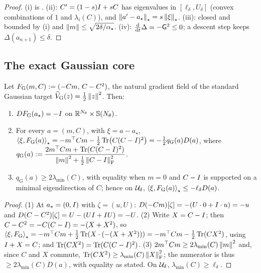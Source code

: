 \begin{proof}
(i) is . (ii): $C'=(1-s)I+sC$ has eigenvalues in $[\ell_\delta,U_\delta]$ (convex
combinations of $1$ and $\lambda_i(C)$), and $\left\lVert a'-a_\star\right\rVert_\star=s\left\lVert \xi\right\rVert_\star$. (iii): closed
and bounded by (i) and $\left\lVert m\right\rVert\leq\sqrt{2\delta/\alpha_\star}$. (iv): $\tfrac{\mathrm{d}}{\mathrm{d} t}\Delta=-\mathsf{G}^2\leq0$;
a descent step keeps $\Delta(a_{n+1})\leq\delta$.
\end{proof}

\subsection{The exact Gaussian core}

\begin{lemma}
\label{lem:gauss-core}
Let $F_{\mathrm G}(m,C):=(-Cm,\,C-C^2)$, the natural gradient field of the standard Gaussian target
$\widehat V_{\mathrm G}(z)=\tfrac12\left\lVert z\right\rVert^2$. Then:
\begin{enumerate}
\item $DF_{\mathrm G}(a_\star)=-I$ on $\mathbb{R}^{N_\theta}\times\mathbb{S}(N_\theta)$.
\item For every $a=(m,C)$, with $\xi=a-a_\star$,
$\left\langle \xi,F_{\mathrm G}(a)\right\rangle_\star=-m^\top Cm-\tfrac12\operatorname{Tr}\bigl(C(C-I)^2\bigr)=-\tfrac12q_{\mathrm G}(a)D(a)$,
where $q_{\mathrm G}(a):=\dfrac{2m^\top Cm+\operatorname{Tr}(C(C-I)^2)}{\left\lVert m\right\rVert^2+\tfrac12\left\lVert C-I\right\rVert_{\mathrm{F}}^2}$.
\item $q_{\mathrm G}(a)\geq2\lambda_{\min}(C)$, with equality when $m=0$ and $C-I$ is supported on
a minimal eigendirection of $C$; hence on $\mathcal{U}_\delta$,
$\left\langle \xi,F_{\mathrm G}(a)\right\rangle_\star\leq-\ell_\delta D(a)$.
\end{enumerate}
\end{lemma}

\begin{proof}
(1) At $a_\star=(0,I)$ with $\zeta=(u,U)$: $D(-Cm)[\zeta]=-(U\cdot0+I\cdot u)=-u$ and
$D(C-C^2)[\zeta]=U-(UI+I U)=-U$. (2) Write $X=C-I$; then $C-C^2=-C(C-I)=-(X+X^2)$, so
$\left\langle \xi,F_{\mathrm G}\right\rangle_\star=-m^\top Cm+\tfrac12\operatorname{Tr}(X\cdot(-(X+X^2)))=-m^\top Cm-\tfrac12\operatorname{Tr}(CX^2)$,
using $I+X=C$; and $\operatorname{Tr}(CX^2)=\operatorname{Tr}(C(C-I)^2)$. (3) $2m^\top Cm\geq2\lambda_{\min}(C)\left\lVert m\right\rVert^2$ and,
since $C$ and $X$ commute, $\operatorname{Tr}(CX^2)\geq\lambda_{\min}(C)\left\lVert X\right\rVert_{\mathrm{F}}^2$; the numerator is thus
$\geq2\lambda_{\min}(C)D(a)$, with equality as stated. On $\mathcal{U}_\delta$,
$\lambda_{\min}(C)\geq\ell_\delta$.
\end{proof}

